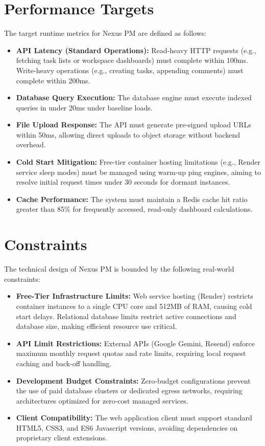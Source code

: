 \section{Performance Targets}
The target runtime metrics for Nexus PM are defined as follows:
\begin{itemize}
    \item \textbf{API Latency (Standard Operations):} Read-heavy HTTP requests (e.g., fetching task lists or workspace dashboards) must complete within 100ms. Write-heavy operations (e.g., creating tasks, appending comments) must complete within 200ms.
    \item \textbf{Database Query Execution:} The database engine must execute indexed queries in under 20ms under baseline loads.
    \item \textbf{File Upload Response:} The API must generate pre-signed upload URLs within 50ms, allowing direct uploads to object storage without backend overhead.
    \item \textbf{Cold Start Mitigation:} Free-tier container hosting limitations (e.g., Render service sleep modes) must be managed using warm-up ping engines, aiming to resolve initial request times under 30 seconds for dormant instances.
    \item \textbf{Cache Performance:} The system must maintain a Redis cache hit ratio greater than 85\% for frequently accessed, read-only dashboard calculations.
\end{itemize}

\section{Constraints}
The technical design of Nexus PM is bounded by the following real-world constraints:
\begin{itemize}
    \item \textbf{Free-Tier Infrastructure Limits:} Web service hosting (Render) restricts container instances to a single CPU core and 512MB of RAM, causing cold start delays. Relational database limits restrict active connections and database size, making efficient resource use critical.
    \item \textbf{API Limit Restrictions:} External APIs (Google Gemini, Resend) enforce maximum monthly request quotas and rate limits, requiring local request caching and back-off handling.
    \item \textbf{Development Budget Constraints:} Zero-budget configurations prevent the use of paid database clusters or dedicated egress networks, requiring architectures optimized for zero-cost managed services.
    \item \textbf{Client Compatibility:} The web application client must support standard HTML5, CSS3, and ES6 Javascript versions, avoiding dependencies on proprietary client extensions.
\end{itemize}

